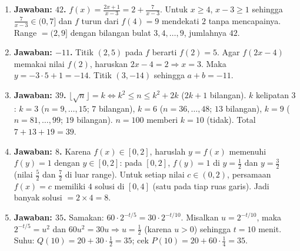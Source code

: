 \documentclass[a4paper,11pt]{article}
\newcounter{no}
\begin{document}
\par{}\par\vspace{0.2em}
\small\begin{enumerate}[leftmargin=2em,itemsep=2pt,topsep=2pt]
\item[\textbf{1.}] \textbf{Jawaban: $42$.} $f(x)=\frac{2x+1}{x-3}=2+\frac7{x-3}$. Untuk $x\ge4$, $x-3\ge1$ sehingga $\frac7{x-3}\in(0,7]$ dan $f$ turun dari $f(4)=9$ mendekati $2$ tanpa mencapainya. Range $=(2,9]$ dengan bilangan bulat $3,4,\dots,9$, jumlahnya $42$.
\item[\textbf{2.}] \textbf{Jawaban: $-11$.} Titik $(2,5)$ pada $f$ berarti $f(2)=5$. Agar $f(2x-4)$ memakai nilai $f(2)$, haruskan $2x-4=2\Rightarrow x=3$. Maka $y=-3\cdot5+1=-14$. Titik $(3,-14)$ sehingga $a+b=-11$.
\item[\textbf{3.}] \textbf{Jawaban: $39$.} $\lfloor\sqrt n\rfloor=k\iff k^2\le n\le k^2+2k$ ($2k+1$ bilangan). $k$ kelipatan $3$: $k=3$ ($n=9,\dots,15$; $7$ bilangan), $k=6$ ($n=36,\dots,48$; $13$ bilangan), $k=9$ ($n=81,\dots,99$; $19$ bilangan). $n=100$ memberi $k=10$ (tidak). Total $7+13+19=39$.
\item[\textbf{4.}] \textbf{Jawaban: $8$.} Karena $f(x)\in[0,2]$, haruslah $y=f(x)$ memenuhi $f(y)=1$ dengan $y\in[0,2]$: pada $[0,2]$, $f(y)=1$ di $y=\frac12$ dan $y=\frac32$ (nilai $\frac52$ dan $\frac72$ di luar range). Untuk setiap nilai $c\in(0,2)$, persamaan $f(x)=c$ memiliki $4$ solusi di $[0,4]$ (satu pada tiap ruas garis). Jadi banyak solusi $=2\times4=8$.
\item[\textbf{5.}] \textbf{Jawaban: $35$.} Samakan: $60\cdot2^{-t/5}=30\cdot2^{-t/10}$. Misalkan $u=2^{-t/10}$, maka $2^{-t/5}=u^2$ dan $60u^2=30u\Rightarrow u=\frac12$ (karena $u>0$) sehingga $t=10$ menit. Suhu: $Q(10)=20+30\cdot\frac12=35$; cek $P(10)=20+60\cdot\frac14=35$.
\end{enumerate}
\par{}\par\vspace{0.2em}
\end{document}
